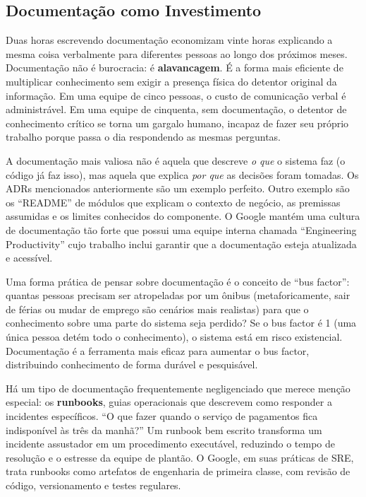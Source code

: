 \subsection{Documentação como Investimento}

Duas horas escrevendo documentação economizam vinte horas explicando a
mesma coisa verbalmente para diferentes pessoas ao longo dos próximos
meses. Documentação não é burocracia: é \textbf{alavancagem}. É a
forma mais eficiente de multiplicar conhecimento sem exigir a presença
física do detentor original da informação. Em uma equipe de cinco pessoas,
o custo de comunicação verbal é administrável. Em uma equipe de cinquenta,
sem documentação, o detentor de conhecimento crítico se torna um gargalo
humano, incapaz de fazer seu próprio trabalho porque passa o dia
respondendo as mesmas perguntas.

A documentação mais valiosa não é aquela que descreve \emph{o que} o
sistema faz (o código já faz isso), mas aquela que explica \emph{por que}
as decisões foram tomadas. Os ADRs mencionados anteriormente são um
exemplo perfeito. Outro exemplo são os ``README'' de módulos que explicam
o contexto de negócio, as premissas assumidas e os limites conhecidos do
componente. O Google mantém uma cultura de documentação tão forte que
possui uma equipe interna chamada ``Engineering Productivity'' cujo
trabalho inclui garantir que a documentação esteja atualizada e acessível.

Uma forma prática de pensar sobre documentação é o conceito de ``bus
factor'': quantas pessoas precisam ser atropeladas por um ônibus
(metaforicamente, sair de férias ou mudar de emprego são cenários
mais realistas) para que o conhecimento sobre uma parte do sistema seja
perdido? Se o bus factor é 1 (uma única pessoa detém todo o
conhecimento), o sistema está em risco existencial. Documentação é a
ferramenta mais eficaz para aumentar o bus factor, distribuindo
conhecimento de forma durável e pesquisável.

Há um tipo de documentação frequentemente negligenciado que merece menção
especial: os \textbf{runbooks}, guias operacionais que descrevem como
responder a incidentes específicos. ``O que fazer quando o serviço de
pagamentos fica indisponível às três da manhã?'' Um runbook bem escrito
transforma um incidente assustador em um procedimento executável,
reduzindo o tempo de resolução e o estresse da equipe de plantão. O
Google, em suas práticas de SRE, trata runbooks como artefatos de
engenharia de primeira classe, com revisão de código, versionamento e
testes regulares.

